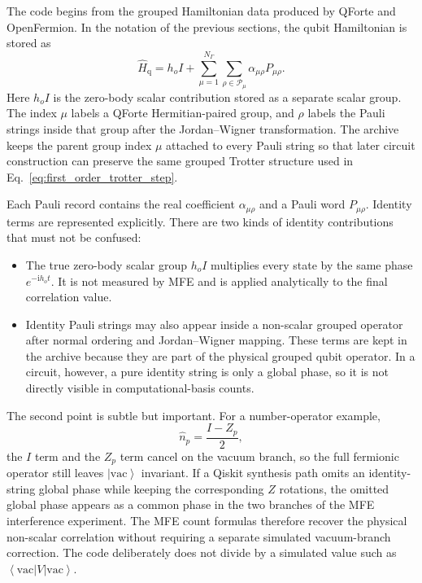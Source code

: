 \documentclass[11pt]{article}
\newcommand{\ii}{\mathrm{i}}
\newcommand{\ket}[1]{\left|#1\right\rangle}
\newcommand{\bra}[1]{\left\langle#1\right|}
\begin{document}
The code begins from the grouped Hamiltonian data produced by QForte and OpenFermion.  In the notation of the previous sections, the qubit Hamiltonian is stored as
\begin{equation}
    \hat{H}_{\mathrm{q}}
    =
    h_o I
    +
    \sum_{\mu=1}^{N_\Gamma}
    \sum_{\rho\in\mathcal{P}_\mu}
    \alpha_{\mu\rho}P_{\mu\rho}.
    \label{eq:code_pauli_archive_hamiltonian}
\end{equation}
Here $h_o I$ is the zero-body scalar contribution stored as a separate scalar group.  The index $\mu$ labels a QForte Hermitian-paired group, and $\rho$ labels the Pauli strings inside that group after the Jordan--Wigner transformation.  The archive keeps the parent group index $\mu$ attached to every Pauli string so that later circuit construction can preserve the same grouped Trotter structure used in Eq.~\eqref{eq:first_order_trotter_step}.

Each Pauli record contains the real coefficient $\alpha_{\mu\rho}$ and a Pauli word $P_{\mu\rho}$.  Identity terms are represented explicitly.  There are two kinds of identity contributions that must not be confused:
\begin{itemize}
    \item The true zero-body scalar group $h_o I$ multiplies every state by the same phase $e^{-\ii h_o t}$.  It is not measured by MFE and is applied analytically to the final correlation value.
    \item Identity Pauli strings may also appear inside a non-scalar grouped operator after normal ordering and Jordan--Wigner mapping.  These terms are kept in the archive because they are part of the physical grouped qubit operator.  In a circuit, however, a pure identity string is only a global phase, so it is not directly visible in computational-basis counts.
\end{itemize}
The second point is subtle but important.  For a number-operator example,
\begin{equation}
    \hat{n}_p=\frac{I-Z_p}{2},
\end{equation}
the $I$ term and the $Z_p$ term cancel on the vacuum branch, so the full fermionic operator still leaves $\ket{\mathrm{vac}}$ invariant.  If a Qiskit synthesis path omits an identity-string global phase while keeping the corresponding $Z$ rotations, the omitted global phase appears as a common phase in the two branches of the MFE interference experiment.  The MFE count formulas therefore recover the physical non-scalar correlation without requiring a separate simulated vacuum-branch correction.  The code deliberately does not divide by a simulated value such as $\bra{\mathrm{vac}}V\ket{\mathrm{vac}}$.
\end{document}
